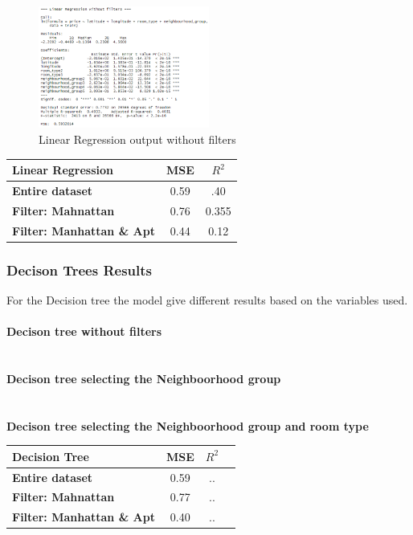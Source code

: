 \documentclass{FR16}
\begin{document}
\begin{figure}[H]
\centering
\includegraphics[width=0.5\textwidth]{figures/lm1.PNG} 
\caption{\label{fig:5} Linear Regression output without filters }
\end{figure}



\begin{center}
\begin{tabular}{l  c c }
\arrayrulecolor{Azzurro}
\hline
{\bfseries Linear Regression
} & MSE & $R^2$  \\
\hline
{\bfseries Entire dataset} & 0.59 & .40  \\
{\bfseries Filter: Mahnattan} & 0.76 & 0.355  \\
{\bfseries Filter: Manhattan \& Apt} & 0.44 &  0.12  \\
\hline
\end{tabular}
\end{center}


\subsubsection{Decison Trees Results}
For the Decision tree the model give different results based on the variables used.
\\\\ \textbf{Decison tree  without filters}\\
\\\\
\textbf{Decison tree selecting the Neighboorhood group}\\
\\\\ 
\textbf{Decison tree  selecting the Neighboorhood group and room type}



\begin{center}
\begin{tabular}{l c c c }
\arrayrulecolor{Azzurro}
\hline
{\bfseries Decision Tree
} & MSE & $R^2$  \\
\hline
{\bfseries Entire dataset} & 0.59 & ..  \\
{\bfseries Filter: Mahnattan} & 0.77 & ..  \\
{\bfseries Filter: Manhattan \& Apt} &  0.40 & ..  \\
\hline
\end{tabular}
\end{center}
\end{document}
